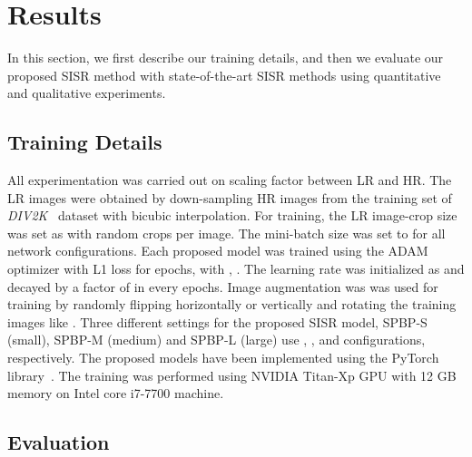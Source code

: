 \documentclass[a4paper,11pt]{article}
\begin{document}
  

\section{Results}
\label{results}

In this section, we first describe our training details, and then we evaluate our proposed SISR method with state-of-the-art SISR methods using quantitative and qualitative experiments.














\subsection{Training Details}

All experimentation was carried out on  scaling factor between LR and HR. The LR images were obtained by down-sampling HR images from the training set of \textit{DIV2K}~\cite{DIV2K} dataset with bicubic interpolation. For training, the LR image-crop size was set as  with  random crops per image. The mini-batch size was set to  for all network configurations. Each proposed model was trained using the ADAM optimizer with L1 loss for  epochs, with , . The learning rate was initialized as  and decayed by a factor of  in every  epochs. Image augmentation was was used for training by randomly flipping horizontally or vertically and rotating the training images like \cite{EDSR, SRFBN}. Three different settings for the proposed SISR model, SPBP-S (small), SPBP-M (medium) and SPBP-L (large) use , , and  configurations, respectively. The proposed models have been implemented using the PyTorch library~\cite{paszke2017automatic}. The training was performed using NVIDIA Titan-Xp GPU with 12 GB memory on Intel core i7-7700 machine.

\subsection{Evaluation}
\end{document}
